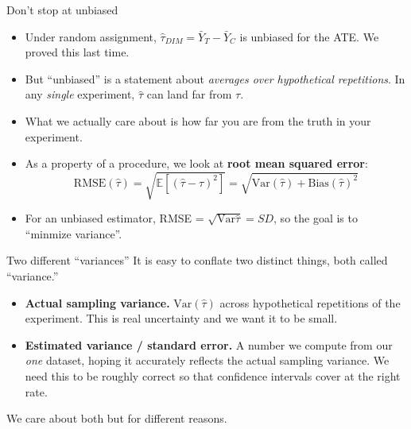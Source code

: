 \documentclass[xcolor=dvipsnames]{beamer}
\newcommand\E{\mathbb{E}}
\newcommand{\Var}{\mathrm{Var}}
\begin{document}
\begin{frame}{Don't stop at unbiased}
\begin{itemize}
\item<1-> Under random assignment, $\hat\tau_{DIM} = \bar Y_{T} - \bar Y_{C}$
  is unbiased for the ATE. We proved this last time. \medskip
\item<2-> But ``unbiased'' is a statement about \textit{averages over
  hypothetical repetitions}. In any \textit{single} experiment, $\hat\tau$
  can land far from $\tau$. \medskip
\item<3-> What we actually care about is how far you are from the truth in your experiment. 
\medskip
\item<4-> As a property of a procedure, we look at \textbf{root mean
  squared error}:
  \[
  \mathrm{RMSE}(\hat\tau) = \sqrt{\E[(\hat\tau - \tau)^2]}
  = \sqrt{\Var(\hat\tau) + \mathrm{Bias}(\hat\tau)^2}
  \]
\item<4-> For an unbiased estimator, RMSE = $\sqrt{\Var{\hat\tau}}= SD$, so the goal is to ``minmize variance''.
\end{itemize}
\end{frame}


\begin{frame}{Two different ``variances''}
\small
It is easy to conflate two distinct things, both called ``variance.''
\begin{itemize}
\item<1-> \textbf{Actual sampling variance.} $\Var(\hat\tau)$ across
  hypothetical repetitions of the experiment. This is real uncertainty and we want it to be small.
  \bigskip
\item<2-> \textbf{Estimated variance / standard error.} A number we
  compute from our \textit{one} dataset, hoping it accurately reflects
  the actual sampling variance. We need this to be roughly correct so
  that confidence intervals cover at the right rate.
\end{itemize}
\bigskip
{} We care about both but for different reasons. \\
\end{frame}
\end{document}
